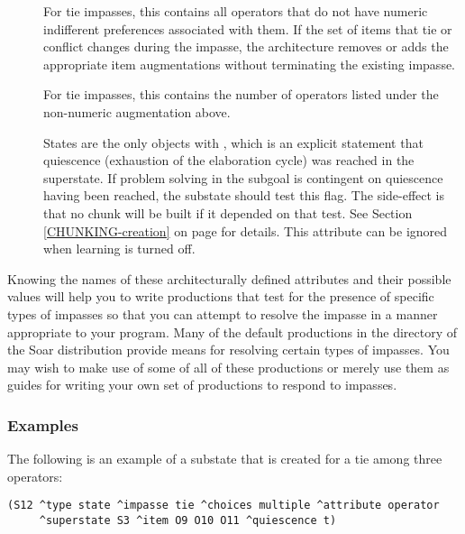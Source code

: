 \begin{description}
\item [] For tie impasses, this contains all operators that
        do not have numeric indifferent preferences associated with them. If the
        set of items that tie or conflict changes during the impasse, the
        architecture removes or adds the appropriate item augmentations without
        terminating the existing impasse. \vspace{-8pt}

\item [] For tie impasses, this contains the
        number of operators listed under the non-numeric augmentation above.\vspace{-8pt}

\item [] States are the only objects with 
, which is an explicit statement that quiescence (exhaustion of the
        elaboration cycle) was reached in the superstate.  If problem solving
        in the subgoal is contingent on quiescence having been reached, the
        substate should test this flag.  The side-effect is that no chunk will
        be built if it depended on that test. See Section
        \ref{CHUNKING-creation} on page \pageref{CHUNKING-creation} for
        details. This attribute can be ignored when learning is turned off.

\end{description} 

Knowing the names of these architecturally defined attributes and their
possible values will help you to write productions that test for the presence
of specific types of impasses so that you can attempt to resolve the impasse
in a manner appropriate to your program. Many of the default
productions in the  directory of the Soar distribution
 provide means for resolving
certain types of impasses. You may wish to make use of some of all of these
productions or merely use them as guides for writing your own set of
productions to respond to impasses.

\subsubsection*{Examples}

The following is an example of a substate that is created for a tie among
three operators:
\begin{verbatim}
(S12 ^type state ^impasse tie ^choices multiple ^attribute operator 
     ^superstate S3 ^item O9 O10 O11 ^quiescence t)
\end{verbatim} \vspace{12pt}


